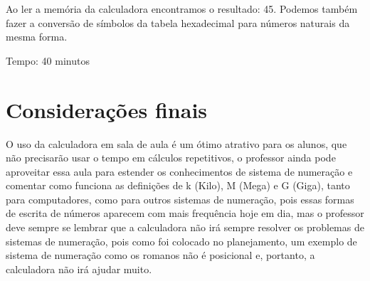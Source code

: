\documentclass[12pt, openright, a4paper, brazil, openany, oneside]{abntex2}
\begin{document}
Ao ler a memória da calculadora encontramos o resultado: 45.
Podemos também fazer a conversão de símbolos da tabela hexadecimal para números naturais da mesma forma.

Tempo: 40 minutos



\chapter{Considerações finais}

O uso da calculadora em sala de aula é um ótimo atrativo para os alunos, que não precisarão usar o tempo em cálculos repetitivos, o professor ainda pode aproveitar essa aula para estender os conhecimentos de sistema de numeração e comentar como funciona as definições de k (Kilo), M (Mega) e G (Giga), tanto para computadores, como para outros sistemas de numeração, pois essas formas de escrita de números aparecem com mais frequência hoje em dia, mas o professor deve sempre se lembrar que a calculadora não irá sempre resolver os problemas de sistemas de numeração, pois como foi colocado no planejamento, um exemplo de sistema de numeração como os romanos não é posicional e, portanto, a calculadora não irá ajudar muito. 
\end{document}
